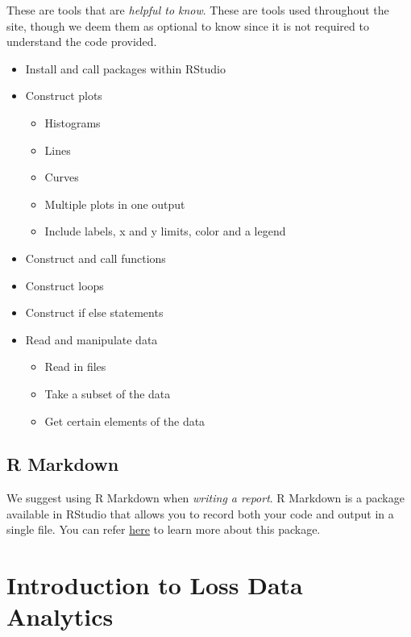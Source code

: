 \documentclass[]{book}
\providecommand{\tightlist}{%
  \setlength{\itemsep}{0pt}\setlength{\parskip}{0pt}}
\theoremstyle{definition}
\theoremstyle{definition}
\theoremstyle{definition}
\theoremstyle{remark}
\begin{document}
These are tools that are \emph{helpful to know}. These are tools used
throughout the site, though we deem them as optional to know since it is
not required to understand the code provided.

\begin{itemize}
\tightlist
\item
  Install and call packages within RStudio
\item
  Construct plots

  \begin{itemize}
  \tightlist
  \item
    Histograms
  \item
    Lines
  \item
    Curves
  \item
    Multiple plots in one output
  \item
    Include labels, x and y limits, color and a legend\\
  \end{itemize}
\item
  Construct and call functions
\item
  Construct loops
\item
  Construct if else statements
\item
  Read and manipulate data

  \begin{itemize}
  \tightlist
  \item
    Read in files
  \item
    Take a subset of the data
  \item
    Get certain elements of the data
  \end{itemize}
\end{itemize}

\section{R Markdown}\label{r-markdown}

We suggest using R Markdown when \emph{writing a report}. R Markdown is
a package available in RStudio that allows you to record both your code
and output in a single file. You can refer
\href{https://rmarkdown.rstudio.com/index.html}{here} to learn more
about this package.

\chapter{Introduction to Loss Data
Analytics}\label{introduction-to-loss-data-analytics}
\end{document}
